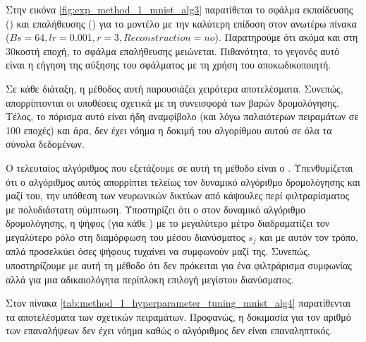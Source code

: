 Στην εικόνα \ref{fig:exp_method_1_mnist_alg3} παρατίθεται το σφάλμα εκπαίδευσης () και επαλήθευσης () για το μοντέλο με την καλύτερη επίδοση στον ανωτέρω πίνακα ($Bs = 64, lr = 0.001, r = 3, Reconstruction = no$). Παρατηρούμε ότι ακόμα και στη 30κοστή εποχή, το σφάλμα επαλήθευσης μειώνεται. Πιθανότητα, το γεγονός αυτό είναι η εήγηση της αύξησης του σφάλματος με τη χρήση του αποκωδικοποιητή.\par

Σε κάθε διάταξη, η μέθοδος αυτή παρουσιάζει χειρότερα αποτελέσματα. Συνεπώς, απορρίπτονται οι υποθέσεις σχετικά με τη συνεισφορά των βαρών δρομολόγησης. Τέλος, το πόρισμα αυτό είναι ήδη αναμφίβολο (και λόγω παλαιότερων πειραμάτων σε 100 εποχές) και άρα, δεν έχει νόημα η δοκιμή του αλγορίθμου αυτού σε όλα τα σύνολα δεδομένων.\par

Ο τελευταίος αλγόριθμος που εξετάζουμε σε αυτή τη μέθοδο είναι ο . Υπενθυμίζεται ότι ο αλγόριθμος αυτός απορρίπτει τελείως τον δυναμικό αλγόριθμο δρομολόγησης και μαζί του, την υπόθεση των νευρωνικών δικτύων από κάψουλες περί φιλτραρίσματος με πολυδιάστατη σύμπτωση. Υποστηρίζει ότι ο στον δυναμικό αλγόριθμο δρομολόγησης, η ψήφος (για κάθε ) με το μεγαλύτερο μέτρο διαδραματίζει τον μεγαλύτερο ρόλο στη διαμόρφωση του μέσου διανύσματος $s_j$ και με αυτόν τον τρόπο, απλά προσελκύει όσες ψήφους τυχαίνει να συμφωνούν μαζί της. Συνεπώς, υποστηρίζουμε με αυτή τη μέθοδο ότι δεν πρόκειται για ένα φιλτράρισμα συμφωνίας αλλά για μια αδικαιολόγητα περίπλοκη επιλογή μεγίστου διανύσματος.\par

Στον πίνακα \ref{tab:method_1_hyperparameter_tuning_mnist_alg4} παρατίθενται τα αποτελέσματα των σχετικών πειραμάτων. Προφανώς, η δοκιμασία για τον αριθμό των επαναλήψεων δεν έχει νόημα καθώς ο αλγόριθμος δεν είναι επαναληπτικός.

